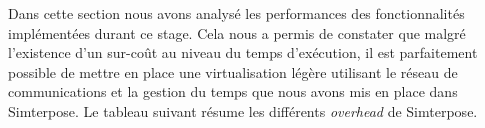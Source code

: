 Dans cette section nous avons analysé les performances des fonctionnalités implémentées durant ce stage. Cela nous a permis de constater que malgré l'existence d'un sur-coût au niveau du temps d'exécution, il est parfaitement possible de mettre en place une virtualisation légère utilisant le réseau de communications et la gestion du temps que nous avons mis en place dans Simterpose. Le tableau suivant résume les différents \textit{overhead} de Simterpose.

\begin{table}[H]
\centering
{}
\caption{\textit{Overhead} du temps d'exécution d'applications avec Simterpose et débit des échanges}
\label{global_overhead}
\end{table}
